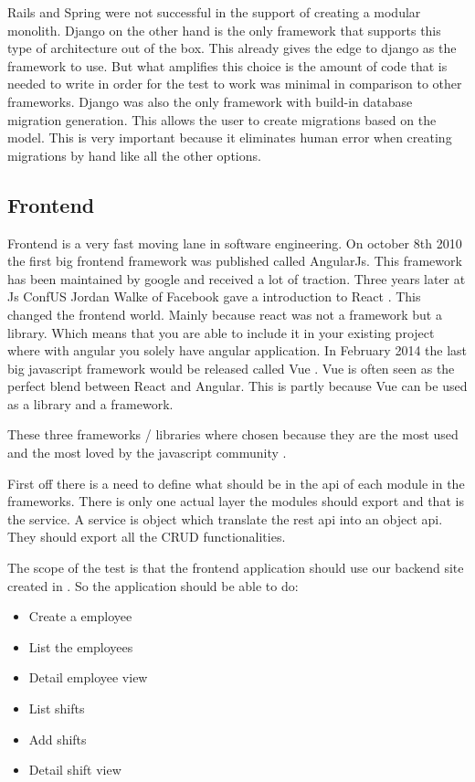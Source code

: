 Rails and Spring were not successful in the support of creating a modular monolith. Django on the other hand is the only framework that supports this type of architecture out of the box. This already gives the edge to django as the framework to use. But what amplifies this choice is the amount of code that is needed to write in order for the test to work was minimal in comparison to other frameworks. Django was also the only framework with build-in database migration generation. This allows the user to create migrations based on the model. This is very important because it eliminates human error when creating migrations by hand like all the other options.

\subsection{Frontend}
\label{sec:Frontend}

Frontend is a very fast moving lane in software engineering. On october 8th 2010 \cite{angularJs} the first big frontend framework was published called AngularJs. This framework has been maintained by google and received a lot of traction. Three years later at Js ConfUS Jordan Walke of Facebook gave a introduction to React \cite{reactJs}. This changed the frontend world. Mainly because react was not a framework but a library. Which means that you are able to include it in your existing project where with angular you solely have angular application. In February 2014 the last big javascript framework would be released called Vue \cite{vueJs}. Vue is often seen as the perfect blend between React and Angular. This is partly because Vue can be used as a library and a framework.

These three frameworks / libraries where chosen because they are the most used and the most loved by the javascript community \cite{allFrontendFrameworks}.

First off there is a need to define what should be in the api of each module in the frameworks. There is only one actual layer the modules should export and that is the service. A service is object which translate the rest api into an object api. They should export all the CRUD functionalities.

The scope of the test is that the frontend application should use our backend site created in . So the application should be able to do:

\begin{itemize}
    \item Create a employee
    \item List the employees
    \item Detail employee view
    \item List shifts
    \item Add shifts
    \item Detail shift view
\end{itemize}

